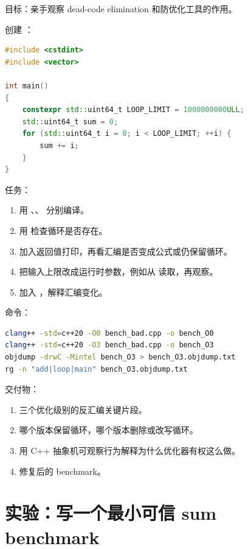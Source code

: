 \begin{labbox}
目标：亲手观察 dead-code elimination 和防优化工具的作用。

创建 ：

\begin{lstlisting}[language=C++]
#include <cstdint>
#include <vector>

int main()
{
    constexpr std::uint64_t LOOP_LIMIT = 1000000000ULL;
    std::uint64_t sum = 0;
    for (std::uint64_t i = 0; i < LOOP_LIMIT; ++i) {
        sum += i;
    }
}
\end{lstlisting}

任务：

\begin{enumerate}
  \item 用 、、 分别编译。
  \item 用  检查循环是否存在。
  \item 加入返回值打印，再看汇编是否变成公式或仍保留循环。
  \item 把输入上限改成运行时参数，例如从  读取，再观察。
  \item 加入 ，解释汇编变化。
\end{enumerate}

命令：

\begin{lstlisting}[language=bash]
clang++ -std=c++20 -O0 bench_bad.cpp -o bench_O0
clang++ -std=c++20 -O3 bench_bad.cpp -o bench_O3
objdump -drwC -Mintel bench_O3 > bench_O3.objdump.txt
rg -n "add|loop|main" bench_O3.objdump.txt
\end{lstlisting}

交付物：

\begin{enumerate}
  \item 三个优化级别的反汇编关键片段。
  \item 哪个版本保留循环，哪个版本删除或改写循环。
  \item 用 C++ 抽象机可观察行为解释为什么优化器有权这么做。
  \item 修复后的 benchmark。
\end{enumerate}
\end{labbox}

\section{实验：写一个最小可信 sum benchmark}

